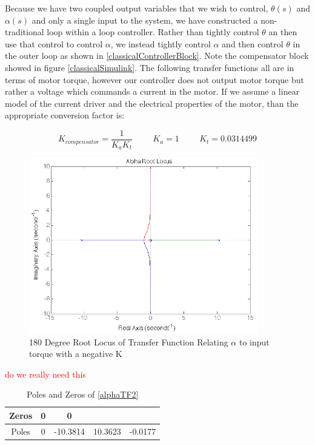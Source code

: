 \documentclass{article}
\newcommand{\xxx}[1]{\textcolor{red}{#1}}
\theoremstyle{plain}
\theoremstyle{definition}
\theoremstyle{remark}
\begin{document}
Because we have two coupled output variables that we wish to control, $\theta(s)$ and $\alpha(s)$ and only a single input to the system, we have constructed a non-traditional loop within a loop controller.  Rather than tightly control $\theta$ an then use that control to control $\alpha$, we instead tightly control $\alpha$ and then control $\theta$ in the outer loop as shown in \ref{classicalControllerBlock}.  Note the compensator block showed in figure \ref{classicalSimulink}.  The following transfer functions all are in terms of motor torque, however our controller does not output motor torque but rather a voltage which commands a current in the motor. If we assume a linear model of the current driver and the electrical properties of the motor, than the appropriate conversion factor is:

$$ K_{compensator} = \frac{1}{K_a K_t} \hspace{1cm} K_a = 1 \hspace{1cm}  K_t = 0.0314499 $$

\begin{figure}
\begin{center}
\includegraphics[width = 10cm]{alpha-1closedLoop.png}
\end{center}
\caption{180 Degree Root Locus of Transfer Function Relating $\alpha$ to input torque with a negative K}
\label{q8alphaInit}
\end{figure}

\xxx{do we really need this}
\begin{table}
\begin{center}
    \begin{tabular}{|c|c|c|c|c|}
        \hline
        Zeros & 0 & 0        & ~       & ~       \\ \hline
        Poles & 0 & -10.3814 & 10.3623 & -0.0177 \\
        \hline
    \end{tabular}
\caption{Poles and Zeros of \eqref{alphaTF2}}
\label{Alpharoots}
\end{center}
\end{table}
\end{document}
